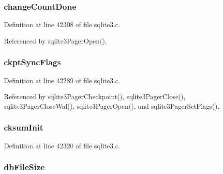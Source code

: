 \hypertarget{struct_pager_a4d340a3a1e54fa5af0bd842c1dd574bd}{}
\subsubsection[{change\+Count\+Done}]{ change\+Count\+Done}\label{struct_pager_a4d340a3a1e54fa5af0bd842c1dd574bd}


Definition at line 42308 of file sqlite3.\+c.



Referenced by sqlite3\+Pager\+Open().

\hypertarget{struct_pager_a8a12bb12711fc9df4c228d0a8ce6c274}{}
\subsubsection[{ckpt\+Sync\+Flags}]{ ckpt\+Sync\+Flags}\label{struct_pager_a8a12bb12711fc9df4c228d0a8ce6c274}


Definition at line 42289 of file sqlite3.\+c.



Referenced by sqlite3\+Pager\+Checkpoint(), sqlite3\+Pager\+Close(), sqlite3\+Pager\+Close\+Wal(), sqlite3\+Pager\+Open(), and sqlite3\+Pager\+Set\+Flags().

\hypertarget{struct_pager_aa4040b20ac15e54bf0309036afcb0b09}{}
\subsubsection[{cksum\+Init}]{ cksum\+Init}\label{struct_pager_aa4040b20ac15e54bf0309036afcb0b09}


Definition at line 42320 of file sqlite3.\+c.

\hypertarget{struct_pager_a3b0015aba946bd0a07bb904380e60123}{}
\subsubsection[{db\+File\+Size}]{ db\+File\+Size}\label{struct_pager_a3b0015aba946bd0a07bb904380e60123}


